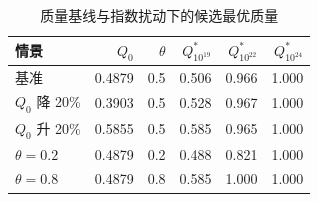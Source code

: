 \begin{table}[!htbp]
  \centering
  \caption{质量基线与指数扰动下的候选最优质量}
  \label{tab:q3-assumption-sensitivity}
  \songti{}
  \begin{tabular}{lrrrrr}
    \toprule
    情景 & $Q_0$ & $\theta$ & $Q^\ast_{10^{19}}$ & $Q^\ast_{10^{22}}$ & $Q^\ast_{10^{24}}$ \\
    \midrule
    基准 & 0.4879 & 0.5 & 0.506 & 0.966 & 1.000 \\
    $Q_0$ 降 20\% & 0.3903 & 0.5 & 0.528 & 0.967 & 1.000 \\
    $Q_0$ 升 20\% & 0.5855 & 0.5 & 0.585 & 0.965 & 1.000 \\
    $\theta=0.2$ & 0.4879 & 0.2 & 0.488 & 0.821 & 1.000 \\
    $\theta=0.8$ & 0.4879 & 0.8 & 0.585 & 1.000 & 1.000 \\
    \bottomrule
  \end{tabular}
\end{table}
